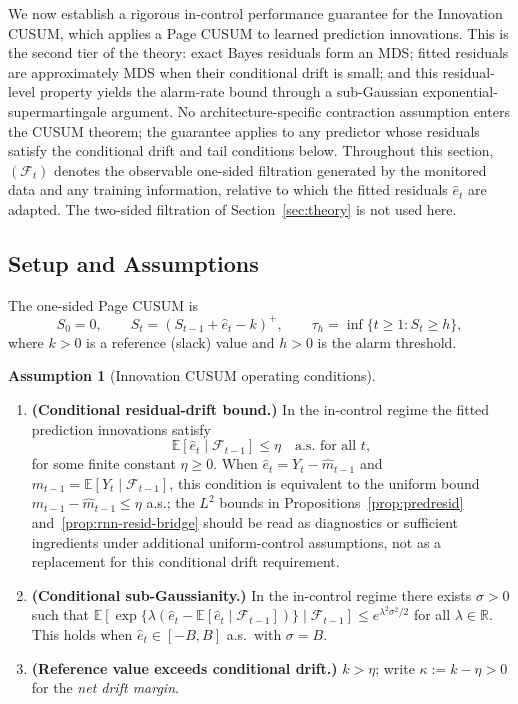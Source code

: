 \documentclass[bj,authoryear]{imsart}
\theoremstyle{plain}
\theoremstyle{definition}
\newtheorem{assumption}{Assumption}[section]
\newcommand{\E}{\mathbb{E}}
\newcommand{\R}{\mathbb{R}}
\newcommand{\F}{\mathcal{F}}
\newcommand{\given}{\mid}
\begin{document}
We now establish a rigorous in-control performance guarantee for the Innovation
CUSUM, which applies a Page CUSUM to learned prediction innovations.  This is
the second tier of the theory: exact Bayes residuals form an MDS; fitted
residuals are approximately MDS when their conditional drift is small; and
this residual-level property yields the alarm-rate bound through a
sub-Gaussian exponential-supermartingale argument.  No architecture-specific
contraction assumption enters the CUSUM theorem; the guarantee applies to any
predictor whose residuals satisfy the conditional drift and tail conditions
below.
%
Throughout this section, $(\F_t)$ denotes the observable one-sided filtration
generated by the monitored data and any training information, relative to
which the fitted residuals $\hat e_t$ are adapted.  The two-sided filtration
of Section~\ref{sec:theory} is not used here.

\subsection{Setup and Assumptions}

The one-sided Page CUSUM \citep{page1954continuous} is
\begin{equation}
  S_0 = 0,\qquad S_t = (S_{t-1}+\hat{e}_t-k)^+,\qquad
  \tau_h = \inf\{t\geq 1: S_t\geq h\},
  \label{eq:cusum}
\end{equation}
where $k>0$ is a reference (slack) value and $h>0$ is the alarm threshold.

\begin{assumption}[Innovation CUSUM operating conditions]
\label{ass:pathway}
  \leavevmode
  \begin{enumerate}[label=(B\arabic*), itemsep=3pt]
    \item \textbf{(Conditional residual-drift bound.)}
      In the in-control regime the fitted prediction innovations satisfy
      \[
        \E[\hat e_t\given\F_{t-1}]\leq \eta
        \quad\text{a.s. for all }t,
      \]
      for some finite constant $\eta\geq0$.  When
      $\hat e_t=Y_t-\hat m_{t-1}$ and
      $m_{t-1}=\E[Y_t\given\F_{t-1}]$, this condition is
      equivalent to the uniform bound
      $m_{t-1}-\hat m_{t-1}\leq\eta$ a.s.; the $L^2$ bounds in
      Propositions~\ref{prop:predresid} and~\ref{prop:rnn-resid-bridge}
      should be read as diagnostics or sufficient ingredients under
      additional uniform-control assumptions, not as a replacement for this
      conditional drift requirement.
    \item \textbf{(Conditional sub-Gaussianity.)}
      In the in-control regime there exists $\sigma>0$ such that
      $\E[\exp\{\lambda(\hat{e}_t-\E[\hat{e}_t\given\F_{t-1}])\}
        \given\F_{t-1}]\leq e^{\lambda^2\sigma^2/2}$
      for all $\lambda\in\R$.  This holds when $\hat{e}_t\in[-B,B]$
      a.s.\ with $\sigma=B$.
    \item \textbf{(Reference value exceeds conditional drift.)}
      $k>\eta$; write $\kappa:=k-\eta>0$ for the \emph{net drift margin}.
  \end{enumerate}
\end{assumption}
\end{document}
